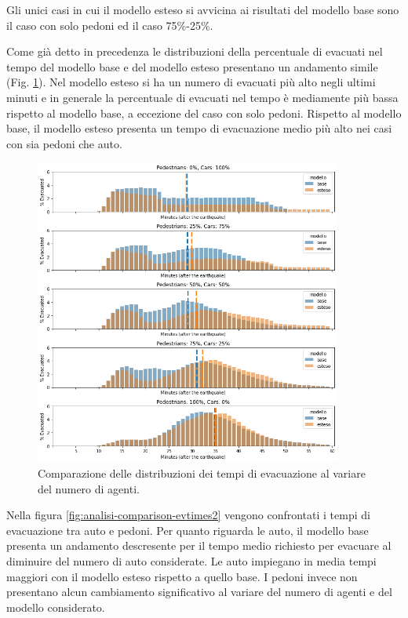 Gli unici casi in cui il modello esteso si avvicina ai risultati del modello base sono il caso con solo pedoni ed il caso 75\%-25\%.

\pagebreak

Come già detto in precedenza le distribuzioni della percentuale di evacuati nel tempo del modello base e del modello esteso 
presentano un andamento simile (Fig. \ref{fig:analisi-comparison-evtimes}).
%
Nel modello esteso si ha un numero di evacuati più alto negli ultimi minuti e 
in generale la percentuale di evacuati nel tempo è mediamente più bassa rispetto al modello base, a eccezione del caso con solo pedoni.
%
Rispetto al modello base, il modello esteso presenta un tempo di evacuazione medio più alto nei casi con sia pedoni che auto.

\begin{figure}[ht]
    \centering
    \includegraphics[width=0.9\textwidth]{images/analisi/comparison-evtimes.png}
    \caption{Comparazione delle distribuzioni dei tempi di evacuazione al variare del numero di agenti.}
    \label{fig:analisi-comparison-evtimes}
\end{figure}


Nella figura \ref{fig:analisi-comparison-evtimes2} vengono confrontati i tempi di evacuazione tra auto e pedoni.
Per quanto riguarda le auto, il modello base presenta un andamento descresente per il tempo medio richiesto per evacuare al diminuire del numero di auto considerate.
Le auto impiegano in media tempi maggiori con il modello esteso rispetto a quello base.
%
I pedoni invece non presentano alcun cambiamento significativo al variare del numero di agenti e del modello considerato. 

